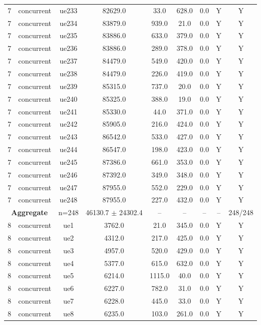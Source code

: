 \begin{table}[ht]
\begin{tabular}{|c|c|c|c|c|c|c|c|c|}
7 & concurrent & ue233 & 82629.0 & 33.0 & 628.0 & 0.0 & Y & Y \\
7 & concurrent & ue234 & 83879.0 & 939.0 & 21.0 & 0.0 & Y & Y \\
7 & concurrent & ue235 & 83886.0 & 633.0 & 379.0 & 0.0 & Y & Y \\
7 & concurrent & ue236 & 83886.0 & 289.0 & 378.0 & 0.0 & Y & Y \\
7 & concurrent & ue237 & 84479.0 & 549.0 & 420.0 & 0.0 & Y & Y \\
7 & concurrent & ue238 & 84479.0 & 226.0 & 419.0 & 0.0 & Y & Y \\
7 & concurrent & ue239 & 85315.0 & 737.0 & 20.0 & 0.0 & Y & Y \\
7 & concurrent & ue240 & 85325.0 & 388.0 & 19.0 & 0.0 & Y & Y \\
7 & concurrent & ue241 & 85330.0 & 44.0 & 371.0 & 0.0 & Y & Y \\
7 & concurrent & ue242 & 85905.0 & 216.0 & 424.0 & 0.0 & Y & Y \\
7 & concurrent & ue243 & 86542.0 & 533.0 & 427.0 & 0.0 & Y & Y \\
7 & concurrent & ue244 & 86547.0 & 198.0 & 423.0 & 0.0 & Y & Y \\
7 & concurrent & ue245 & 87386.0 & 661.0 & 353.0 & 0.0 & Y & Y \\
7 & concurrent & ue246 & 87392.0 & 349.0 & 348.0 & 0.0 & Y & Y \\
7 & concurrent & ue247 & 87955.0 & 552.0 & 229.0 & 0.0 & Y & Y \\
7 & concurrent & ue248 & 87955.0 & 227.0 & 432.0 & 0.0 & Y & Y \\
\multicolumn{2}{|c|}{\textbf{Aggregate}} & n=248 & 46130.7 $\pm$ 24302.4 & -- & -- & -- & -- & 248/248 \\
\hline
8 & concurrent & ue1 & 3762.0 & 21.0 & 345.0 & 0.0 & Y & Y \\
8 & concurrent & ue2 & 4312.0 & 217.0 & 425.0 & 0.0 & Y & Y \\
8 & concurrent & ue3 & 4957.0 & 520.0 & 429.0 & 0.0 & Y & Y \\
8 & concurrent & ue4 & 5377.0 & 615.0 & 632.0 & 0.0 & Y & Y \\
8 & concurrent & ue5 & 6214.0 & 1115.0 & 40.0 & 0.0 & Y & Y \\
8 & concurrent & ue6 & 6227.0 & 782.0 & 31.0 & 0.0 & Y & Y \\
8 & concurrent & ue7 & 6228.0 & 445.0 & 33.0 & 0.0 & Y & Y \\
8 & concurrent & ue8 & 6235.0 & 103.0 & 261.0 & 0.0 & Y & Y \\

\end{tabular}
\end{table}
